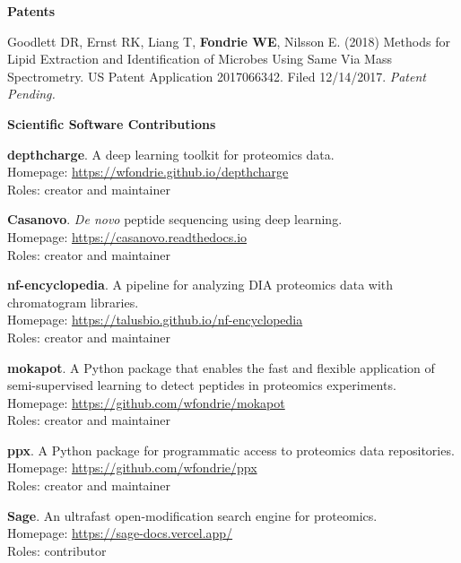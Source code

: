 \documentclass[11pt]{article}
\newcommand{\mysection}[1]{\vspace{1ex} \textbf{\large \textsf{#1} \quad \hrulefill}}
\newcommand{\myref}[1]{\href{#1}{\url{#1}}}
\begin{document}
\mysection{Patents}
\begin{etaremune}
  \item Goodlett DR, Ernst RK, Liang T, \textbf{Fondrie WE}, Nilsson E. (2018)
  Methods for Lipid Extraction and Identification of Microbes Using Same Via
  Mass Spectrometry. US Patent Application 2017066342. Filed 12/14/2017. {\it
    Patent Pending.}
\end{etaremune}


\mysection{Scientific Software Contributions}
\begin{etaremune}
  \item \textbf{depthcharge}. A deep learning toolkit for proteomics data. \\
  Homepage: \myref{https://wfondrie.github.io/depthcharge} \\
  Roles: creator and maintainer

  \item \textbf{Casanovo}. \textit{ De novo } peptide sequencing using deep learning. \\
  Homepage: \myref{https://casanovo.readthedocs.io} \\
  Roles: creator and maintainer

  \item \textbf{nf-encyclopedia}. A pipeline for analyzing DIA proteomics data with chromatogram libraries. \\
  Homepage: \myref{https://talusbio.github.io/nf-encyclopedia} \\
  Roles: creator and maintainer

  \item \textbf{mokapot}. A Python package that enables the fast and flexible
  application of semi-supervised learning to detect peptides in proteomics
  experiments. \\
  Homepage: \myref{https://github.com/wfondrie/mokapot} \\
  Roles: creator and maintainer

  \item \textbf{ppx}. A Python package for programmatic access to proteomics
  data repositories. \\
  Homepage: \myref{https://github.com/wfondrie/ppx} \\
  Roles: creator and maintainer

  \item \textbf{Sage}. An ultrafast open-modification search engine for proteomics. \\
  Homepage: \myref{https://sage-docs.vercel.app/} \\
  Roles: contributor


\end{etaremune}
\end{document}
